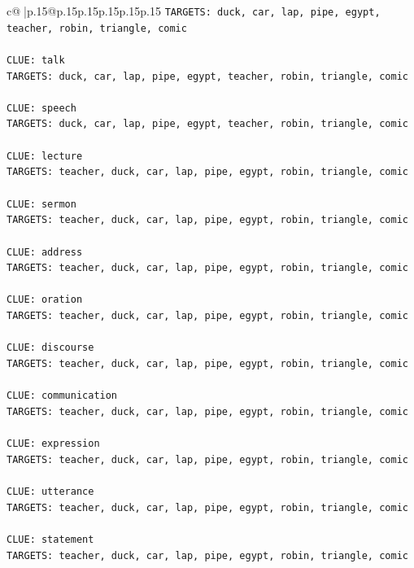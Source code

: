 \documentclass{article}
\begin{document}
{\begin{supertabular}{c@{$\;$}|p{.15\linewidth}@{}p{.15\linewidth}p{.15\linewidth}p{.15\linewidth}p{.15\linewidth}p{.15\linewidth}}
{{{\texttt{TARGETS: duck, car, lap, pipe, egypt, teacher, robin, triangle, comic} \\
\\ 
\texttt{CLUE: talk} \\
\texttt{TARGETS: duck, car, lap, pipe, egypt, teacher, robin, triangle, comic} \\
\\ 
\texttt{CLUE: speech} \\
\texttt{TARGETS: duck, car, lap, pipe, egypt, teacher, robin, triangle, comic} \\
\\ 
\texttt{CLUE: lecture} \\
\texttt{TARGETS: teacher, duck, car, lap, pipe, egypt, robin, triangle, comic} \\
\\ 
\texttt{CLUE: sermon} \\
\texttt{TARGETS: teacher, duck, car, lap, pipe, egypt, robin, triangle, comic} \\
\\ 
\texttt{CLUE: address} \\
\texttt{TARGETS: teacher, duck, car, lap, pipe, egypt, robin, triangle, comic} \\
\\ 
\texttt{CLUE: oration} \\
\texttt{TARGETS: teacher, duck, car, lap, pipe, egypt, robin, triangle, comic} \\
\\ 
\texttt{CLUE: discourse} \\
\texttt{TARGETS: teacher, duck, car, lap, pipe, egypt, robin, triangle, comic} \\
\\ 
\texttt{CLUE: communication} \\
\texttt{TARGETS: teacher, duck, car, lap, pipe, egypt, robin, triangle, comic} \\
\\ 
\texttt{CLUE: expression} \\
\texttt{TARGETS: teacher, duck, car, lap, pipe, egypt, robin, triangle, comic} \\
\\ 
\texttt{CLUE: utterance} \\
\texttt{TARGETS: teacher, duck, car, lap, pipe, egypt, robin, triangle, comic} \\
\\ 
\texttt{CLUE: statement} \\
\texttt{TARGETS: teacher, duck, car, lap, pipe, egypt, robin, triangle, comic} \\
}}}
\end{supertabular}}
\end{document}
